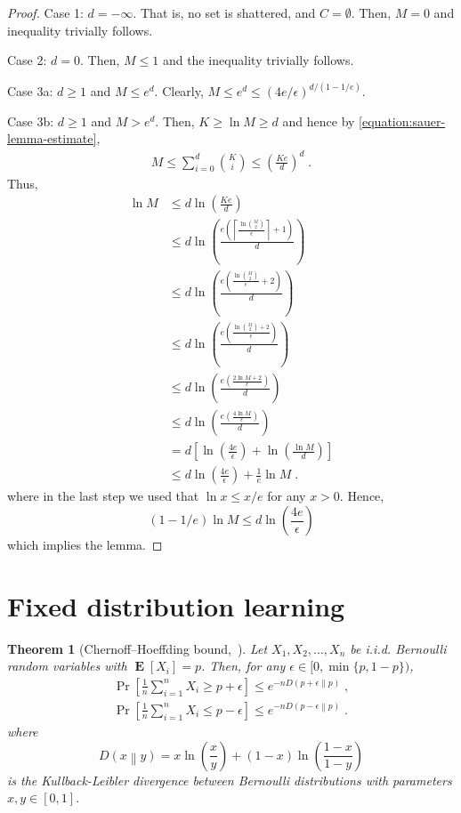 \documentclass[11pt]{article}
\newtheorem{theorem}[proposition]{Theorem}
\newcommand{\KL}[2]{D\left(#1 \middle\| #2 \right)}
\DeclareMathOperator{\Exp}{\mathbf{E}}
\begin{document}
\begin{proof}
Case 1: $d = -\infty$. That is, no set is shattered, and $C = \emptyset$.
Then, $M = 0$ and inequality trivially follows.

Case 2: $d = 0$. Then, $M \le 1$ and the inequality trivially follows.

Case 3a: $d \ge 1$ and $M \le e^d$. Clearly, $M \le e^d \le (4e/\epsilon)^{d/(1 - 1/e)}$.

Case 3b: $d \ge 1$ and $M > e^d$. Then, $K \ge \ln M \ge d$ and
hence by \eqref{equation:sauer-lemma-estimate},
\begin{align*}
M
\le \sum_{i=0}^d \binom{K}{i}
\le \left( \frac{Ke}{d} \right)^d \; .
\end{align*}
Thus,
\begin{align*}
\ln M
& \le d \ln \left( \frac{Ke}{d} \right) \\
& \le d \ln \left( \frac{e \left(\left\lceil \frac{\ln \binom{M}{2}}{\epsilon} \right\rceil + 1 \right)}{d} \right) \\
& \le d \ln \left( \frac{e \left(\frac{\ln \binom{M}{2}}{\epsilon} + 2 \right)}{d} \right) \\
& \le d \ln \left( \frac{e \left(\frac{\ln \binom{M}{2} + 2}{\epsilon} \right)}{d} \right) \\
& \le d \ln \left( \frac{e \left(\frac{2\ln M + 2}{\epsilon} \right)}{d} \right) \\
& \le d \ln \left( \frac{e \left(\frac{4\ln M}{\epsilon} \right)}{d} \right) \\
& = d \left[ \ln \left( \frac{4e}{\epsilon} \right)  + \ln \left(\frac{\ln M}{d} \right) \right] \\
& \le d \ln \left( \frac{4e}{\epsilon} \right) + \frac{1}{e} \ln M \; .
\end{align*}
where in the last step we used that $\ln x \le x/e$ for any $x > 0$.
Hence,
$$
(1 - 1/e) \ln M \le d \ln \left( \frac{4e}{\epsilon} \right)
$$
which implies the lemma.
\end{proof}

\section{Fixed distribution learning}
\label{section:fixed-distribution-learning}

\begin{theorem}[Chernoff--Hoeffding bound,~\cite{h63}]
Let $X_1, X_2, \dots, X_n$ be i.i.d. Bernoulli random variables with $\Exp[X_i] = p$.
Then, for any $\epsilon \in [0, \min\{p,1-p\})$,
\begin{align*}
\Pr \left[{\frac {1}{n}} \sum_{i=1}^n X_i \ge p + \epsilon \right] \le e^{ - n \KL{p + \epsilon}{p}}  \; , \\
\Pr \left[{\frac {1}{n}} \sum_{i=1}^n X_i \le p - \epsilon \right] \le e^{ - n \KL{p - \epsilon}{p}}  \; .
\end{align*}
where
$$
\KL{x}{y} = x \ln \left( \frac{x}{y} \right) + (1 - x) \ln \left( \frac{1-x}{1-y} \right)
$$
is the Kullback-Leibler divergence between Bernoulli distributions with parameters $x, y \in [0,1]$.
\end{theorem}
\end{document}
